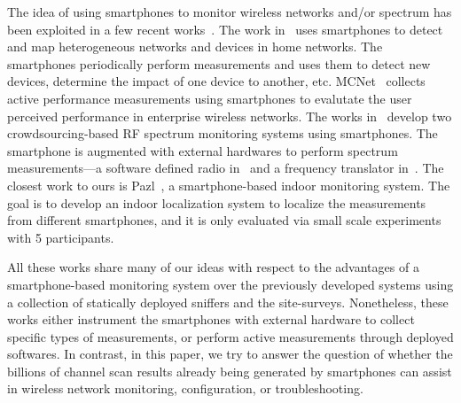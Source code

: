 The idea of using smartphones to monitor wireless networks and/or spectrum has
been exploited in a few recent
works~\cite{nychis:hotwireless2014,nika:hotwireless2014,zhang:hotmobile2015,shi2014crowdsourcing}.
The work in~\cite{nychis:hotwireless2014} uses smartphones to detect and map
heterogeneous networks and devices in home networks. The smartphones
periodically perform measurements and uses them to detect new devices, determine
the impact of one device to another, etc. MCNet~\cite{rosen2014mcnet}
collects active performance measurements using smartphones to evalutate the user
perceived performance in enterprise wireless networks. The works
in~\cite{nika:hotwireless2014,zhang:hotmobile2015} develop two
crowdsourcing-based RF spectrum monitoring systems using smartphones. The
smartphone is augmented with external hardwares to perform spectrum
measurements---a software defined radio in~\cite{nika:hotwireless2014} and a
frequency translator in~\cite{zhang:hotmobile2015}. The closest work to
ours is Pazl~\cite{radu2013pazl}, a smartphone-based indoor \wifi{} monitoring
system. The goal is to develop an indoor localization system to localize
the measurements from different smartphones, and it is only evaluated via small
scale experiments with 5 participants.

All these works share many of our ideas with respect to the advantages of a
smartphone-based monitoring system over the previously developed systems using a
collection of statically deployed sniffers and the site-surveys. Nonetheless,
these works either instrument the smartphones with external
hardware to collect specific types of measurements, or perform active
measurements through deployed softwares. In contrast, in this paper, we try to
answer the question of whether the billions of \wifi{} channel scan results
already being generated by smartphones can assist in wireless network monitoring,
configuration, or troubleshooting.
